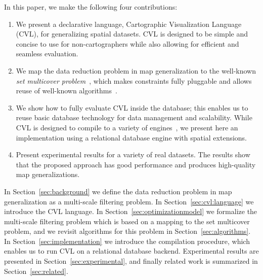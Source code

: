 In this paper, we make the following four contributions:
\begin{enumerate}
\item We present a declarative language, Cartographic Visualization Language (CVL), for generalizing spatial datasets. CVL is designed to be simple and concise to use for non-cartographers while also allowing for efficient and seamless evaluation.

\item We map the data reduction problem in map generalization to the well-known \emph{set multicover problem}~\cite{rajagopalan1998primal}, which makes constraints fully pluggable and allows reuse of well-known algorithms~\cite{rajagopalan1998primal,vazirani2001approximation}.

\item We show how to fully evaluate CVL inside the database; this enables us to reuse basic database technology for data management and scalability. While CVL is designed to compile to a variety of engines~\cite{dean04mapreduce}, we present here an implementation using a relational database engine with spatial extensions.

\item Present experimental results for a variety of real datasets. The results show that the proposed approach has good performance and produces high-quality map generalizations.
\end{enumerate}

In Section~\ref{sec:background} we define the data reduction problem in map generalization as a multi-scale filtering problem. In Section~\ref{sec:cvl:language} we introduce the CVL language. In Section~\ref{sec:optimizationmodel} we formalize the multi-scale filtering problem which is based on a mapping to the set multicover problem, and we revisit algorithms for this problem in Section~\ref{sec:algorithms}. In Section~\ref{sec:implementation} we introduce the compilation procedure, which enables us to run CVL on a relational database backend. Experimental results are presented in Section~\ref{sec:experimental}, and finally related work is summarized in Section~\ref{sec:related}.
